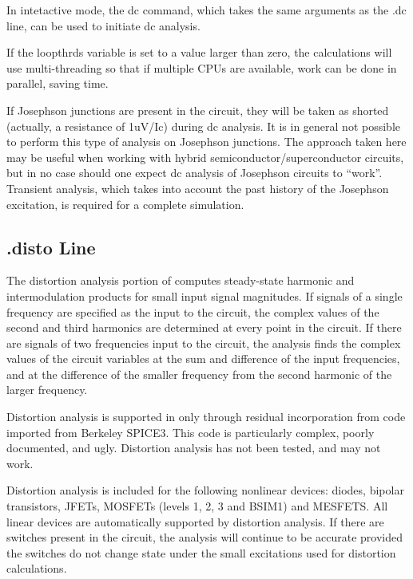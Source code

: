 In intetactive mode, the {\cb dc} command, which takes the same
arguments as the {\vt .dc} line, can be used to initiate dc analysis.

If the {\et loopthrds} variable is set to a value larger than zero,
the calculations will use multi-threading so that if multiple CPUs are
available, work can be done in parallel, saving time.

If Josephson junctions are present in the circuit, they will be taken
as shorted (actually, a resistance of 1uV/Ic) during dc analysis. 
It is in general not possible to perform this type of analysis on
Josephson junctions.  The approach taken here may be useful when
working with hybrid semiconductor/superconductor circuits, but in no
case should one expect dc analysis of Josephson circuits to ``work''. 
Transient analysis, which takes into account the past history of the
Josephson excitation, is required for a complete simulation.

\subsection{{\vt .disto} Line}
\label{distoline}


The distortion analysis portion of {\WRspice} computes steady-state
harmonic and intermodulation products for small input signal
magnitudes.  If signals of a single frequency are specified as the
input to the circuit, the complex values of the second and third
harmonics are determined at every point in the circuit.  If there are
signals of two frequencies input to the circuit, the analysis finds
the complex values of the circuit variables at the sum and difference
of the input frequencies, and at the difference of the smaller
frequency from the second harmonic of the larger frequency.

Distortion analysis is supported in {\WRspice} only through
residual incorporation from code imported from Berkeley SPICE3.  This
code is particularly complex, poorly documented, and ugly.  Distortion
analysis has not been tested, and may not work.

Distortion analysis is included for the following nonlinear devices: 
diodes, bipolar transistors, JFETs, MOSFETs (levels 1, 2, 3 and BSIM1)
and MESFETS.  All linear devices are automatically supported by
distortion analysis.  If there are switches present in the circuit,
the analysis will continue to be accurate provided the switches do not
change state under the small excitations used for distortion
calculations.


